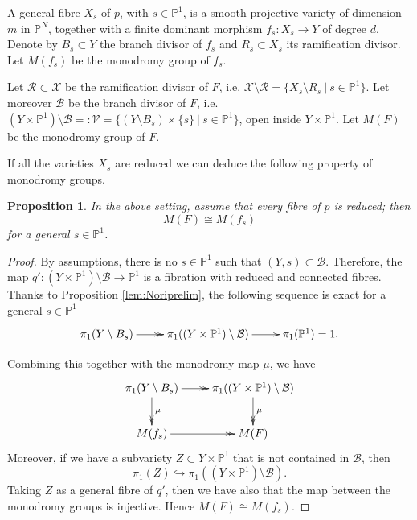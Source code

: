 \documentclass[12pt,a4paper,twoside,leqno,noamsfonts]{amsart}
\newtheorem{prop}[cor]{Proposition}
\theoremstyle{definition}
\newcommand{\bP}{\mathbb{P}}
\newcommand{\cB}{\mathcal{B}}
\newcommand{\cV}{\mathcal{V}}
\newcommand{\cX}{\mathcal{X}}
\begin{document}
A general fibre $ X_s$ of $p$, with $s \in \bP^1$, is a smooth projective variety of dimension $m$ in $\bP^N$, together with a finite dominant morphism $f_s: X_s \to Y$ of degree $d$. 
Denote by $B_s \subset Y$ the branch divisor of $f_s$ and $R_s \subset X_s$ its ramification divisor. Let $M(f_s)$ be the monodromy group of $f_s$.

Let $\mathcal{R}\subset \cX$ be the ramification divisor of $F$, i.e. $\cX \setminus \mathcal{R}=\lbrace  X_s \setminus R_s\  |\ s \in \bP^1 \rbrace$. Let moreover $\mathcal{B}$ be the branch divisor of $F$, i.e. $(Y \times \bP^1) \setminus \mathcal{B}=:\cV=\lbrace  (Y \setminus B_s) \times \{s\}\  |\ s \in \bP^1 \rbrace$, open inside $Y \times \bP^1$. Let $M(F)$ be the monodromy group of $F$.

If all the varieties $X_s$ are reduced we can deduce the following property of monodromy groups.
\begin{prop}\label{lemmagenerale}
In the above setting, assume that every fibre of $p$ is reduced; then 
$$M(F)\cong M(f_s)$$ for a general $s \in \bP^1$. 
\end{prop}
\begin{proof}
By assumptions, there is no $s \in \bP^1$ such that $(Y,s) \subset \mathcal{B}$. Therefore, the map $q': (Y \times \bP^1)\setminus \mathcal{B} \to \bP^1$ is a fibration with reduced and connected fibres. Thanks to Proposition \ref{lem:Noriprelim}, the following sequence is exact for a general $s \in \bP^1$
\begin{equation*}
\xymatrix{
    \pi_1(Y\setminus B_s) \ar@{->>}[r] & \pi_1((Y \times \bP^1) \setminus \mathcal{B}) \ar[r] & \pi_1(\bP^1)=1. }
\end{equation*}

Combining this together with the monodromy map $\mu$, we have 
\begin{equation*}
    \xymatrix{
   \pi_1(Y \setminus B_s) \ar@{->>}[r] \ar@{->>}[d]^\mu & \pi_1((Y \times \bP^1) \setminus \mathcal{B})  \ar@{->>}[d]^\mu\\
   M(f_s) \ar@{->>}[r] & M(F)}
\end{equation*}
Moreover, if we have a subvariety $Z \subset Y\times \bP^1$ that is not contained in $\cB$, then 
\begin{equation*}\label{iniettiva}
    \pi_1(Z) \hookrightarrow \pi_1((Y \times \bP^1) \setminus \mathcal{B}).
\end{equation*}
Taking $Z$ as a general fibre of $q'$, then we have also that the map between the monodromy groups is injective. Hence $M(F) \cong M(f_s)$. 
\end{proof}
\end{document}

